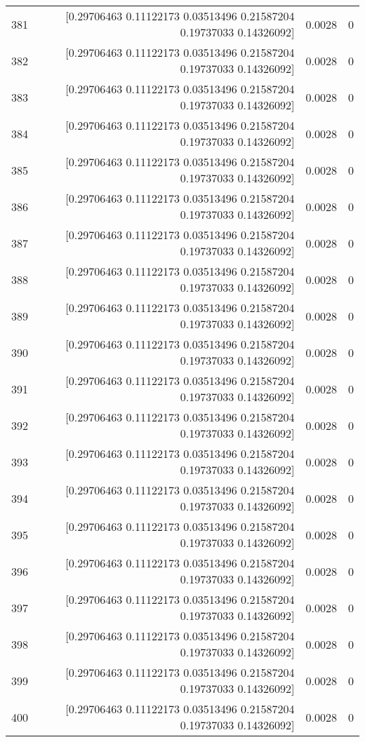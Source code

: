 \begin{longtable}{lrrr}
381 & [0.29706463 0.11122173 0.03513496 0.21587204 0.19737033 0.14326092] & 0.0028 & 0 \\
382 & [0.29706463 0.11122173 0.03513496 0.21587204 0.19737033 0.14326092] & 0.0028 & 0 \\
383 & [0.29706463 0.11122173 0.03513496 0.21587204 0.19737033 0.14326092] & 0.0028 & 0 \\
384 & [0.29706463 0.11122173 0.03513496 0.21587204 0.19737033 0.14326092] & 0.0028 & 0 \\
385 & [0.29706463 0.11122173 0.03513496 0.21587204 0.19737033 0.14326092] & 0.0028 & 0 \\
386 & [0.29706463 0.11122173 0.03513496 0.21587204 0.19737033 0.14326092] & 0.0028 & 0 \\
387 & [0.29706463 0.11122173 0.03513496 0.21587204 0.19737033 0.14326092] & 0.0028 & 0 \\
388 & [0.29706463 0.11122173 0.03513496 0.21587204 0.19737033 0.14326092] & 0.0028 & 0 \\
389 & [0.29706463 0.11122173 0.03513496 0.21587204 0.19737033 0.14326092] & 0.0028 & 0 \\
390 & [0.29706463 0.11122173 0.03513496 0.21587204 0.19737033 0.14326092] & 0.0028 & 0 \\
391 & [0.29706463 0.11122173 0.03513496 0.21587204 0.19737033 0.14326092] & 0.0028 & 0 \\
392 & [0.29706463 0.11122173 0.03513496 0.21587204 0.19737033 0.14326092] & 0.0028 & 0 \\
393 & [0.29706463 0.11122173 0.03513496 0.21587204 0.19737033 0.14326092] & 0.0028 & 0 \\
394 & [0.29706463 0.11122173 0.03513496 0.21587204 0.19737033 0.14326092] & 0.0028 & 0 \\
395 & [0.29706463 0.11122173 0.03513496 0.21587204 0.19737033 0.14326092] & 0.0028 & 0 \\
396 & [0.29706463 0.11122173 0.03513496 0.21587204 0.19737033 0.14326092] & 0.0028 & 0 \\
397 & [0.29706463 0.11122173 0.03513496 0.21587204 0.19737033 0.14326092] & 0.0028 & 0 \\
398 & [0.29706463 0.11122173 0.03513496 0.21587204 0.19737033 0.14326092] & 0.0028 & 0 \\
399 & [0.29706463 0.11122173 0.03513496 0.21587204 0.19737033 0.14326092] & 0.0028 & 0 \\
400 & [0.29706463 0.11122173 0.03513496 0.21587204 0.19737033 0.14326092] & 0.0028 & 0 \\

\end{longtable}
